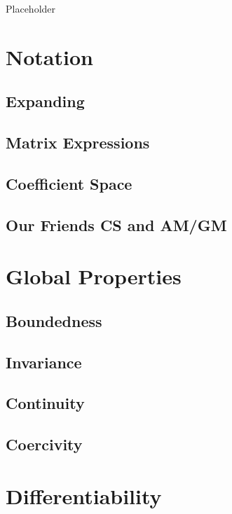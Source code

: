\documentclass[
  12pt,
]{book}
\begin{document}
Placeholder

\section{Notation}\label{propnotation}

\subsection{Expanding}\label{propexpand}

\subsection{Matrix Expressions}\label{propmatrix}

\subsection{Coefficient Space}\label{propcoefspace}

\subsection{Our Friends CS and AM/GM}\label{our-friends-cs-and-amgm}

\section{Global Properties}\label{propglobal}

\subsection{Boundedness}\label{propbounded}

\subsection{Invariance}\label{propinvariance}

\subsection{Continuity}\label{propcontinuity}

\subsection{Coercivity}\label{propcoercive}

\section{Differentiability}\label{propdiff}
\end{document}
